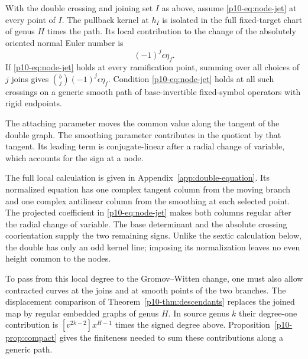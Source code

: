 \begin{theorem}\label{p10-thm:nodes}
With the double crossing and joining set $I$ as above, assume \eqref{p10-eq:node-jet} at every point
of $I$. The pullback kernel at $h_I$ is isolated in the full fixed-target
chart of genus $H$ times the path. Its local contribution to the change
of the absolutely oriented normal Euler number is
\[
                         (-1)^j\epsilon\eta_f .
\]
If \eqref{p10-eq:node-jet} holds at every ramification point, summing over
all choices of $j$ joins gives $\binom bj(-1)^j\epsilon\eta_f$.
Condition \eqref{p10-eq:node-jet} holds at all such crossings on a generic
smooth path of base-invertible fixed-symbol operators with rigid endpoints.
\end{theorem}

The attaching parameter moves the common value along the tangent of
the double graph. The smoothing parameter contributes in the
quotient by that tangent. Its leading term is conjugate-linear after
a radial change of variable, which accounts for the sign at a node.

The full local calculation is given in Appendix~\ref{app:double-equation}.
Its normalized equation has one complex tangent column from the
moving branch and one complex antilinear column from the smoothing
at each selected point. The projected coefficient in
\eqref{p10-eq:node-jet} makes both columns regular after the radial
change of variable. The base determinant and the absolute crossing
coorientation supply the two remaining signs. Unlike the sextic
calculation below, the double has only an odd kernel line; imposing
its normalization leaves no even height common to the nodes.

To pass from this local degree to the Gromov--Witten change, one must
also allow contracted curves at the joins and at smooth points of
the two branches. The displacement comparison of
Theorem~\ref{p10-thm:descendants} replaces the joined map by regular
embedded graphs of genus \(H\). In source genus \(k\) their degree-one
contribution is \([v^{2k-2}]x^{H-1}\) times the signed degree above.
Proposition~\ref{p10-prop:compact} gives the finiteness needed to sum
these contributions along a generic path.

